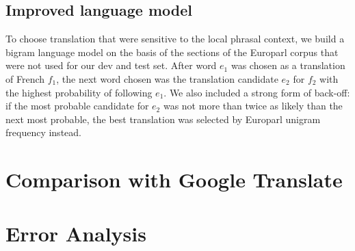 \documentclass{article}
\begin{document}
\subsection{Improved language model}

To choose translation that were sensitive to the local phrasal context, we build a bigram language model on the basis of the sections of the Europarl corpus that were not used for our dev and test set. After word $e_1$ was chosen as a translation of French $f_1$, the next word chosen was the translation candidate $e_2$ for $f_2$ with the highest probability of following $e_1$. We also included a strong form of back-off: if the most probable candidate for $e_2$ was not more than twice as likely than the next most probable, the best translation was selected by Europarl unigram frequency instead.

\section{Comparison with Google Translate}

\section{Error Analysis}
\end{document}
